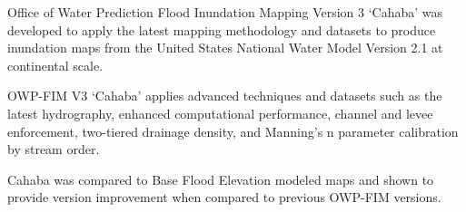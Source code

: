 


\begin{keypoints}
\item Office of Water Prediction Flood Inundation Mapping Version 3 `Cahaba' was developed to apply the latest mapping methodology and datasets to produce inundation maps from the United States National Water Model Version 2.1 at continental scale.
\item OWP-FIM V3 `Cahaba' applies advanced techniques and datasets such as the latest hydrography, enhanced computational performance, channel and levee enforcement, two-tiered drainage density, and Manning's n parameter calibration by stream order.  
\item Cahaba was compared to Base Flood Elevation modeled maps and shown to provide version improvement when compared to previous OWP-FIM versions.
\end{keypoints}
